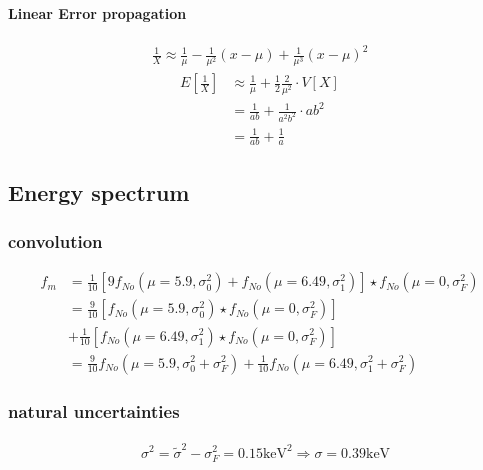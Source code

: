 \paragraph{Linear Error propagation}
\begin{align}
    \frac{1}{X}\approx\frac{1}{\mu}-\frac{1}{\mu^2}\left(x-\mu\right)+\frac{1}{\mu^3}\left(x-\mu\right)^2
\end{align}
\begin{align}
    E\left[\frac{1}{X}\right]&\approx \frac{1}{\mu}+\frac{1}{2}\frac{2}{\mu^2}\cdot V\left[X\right]
    \\&=\frac{1}{ab}+\frac{1}{a^2b^2}\cdot ab^2
    \\&=\frac{1}{ab}+\frac{1}{a}
\end{align}
\subsection{Energy spectrum}
\subsubsection{convolution}
\begin{align}
    f_m&=\frac{1}{10}\left[9f_{No}\left(\mu=5.9,\sigma_0^2\right)+f_{No}\left(\mu = 6.49,\sigma_1^2\right)\right]\star f_{No}\left(\mu = 0, \sigma_F^2\right)
    \\&=\frac{9}{10}\left[f_{No}\left(\mu=5.9,\sigma_0^2\right)\star f_{No}\left(\mu = 0, \sigma_F^2\right)\right]
    \\&+\frac{1}{10}\left[f_{No}\left(\mu=6.49,\sigma_1^2\right)\star f_{No}\left(\mu = 0, \sigma_F^2\right)\right]
    \\&=\frac{9}{10}f_{No}\left(\mu=5.9,\sigma_0^2+\sigma_F^2\right)+\frac{1}{10}f_{No}\left(\mu=6.49,\sigma_1^2+\sigma_F^2\right)
\end{align}
\subsubsection{natural uncertainties}
\begin{align}
    &\sigma^2 = \tilde{\sigma}^2-\sigma_F^2 = 0.15 \text{keV}^2 \Rightarrow \sigma = 0.39 \text{keV}
\end{align}
